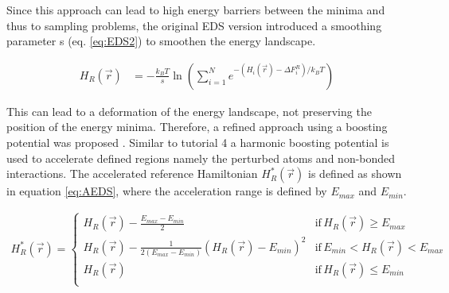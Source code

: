 Since this approach can lead to high energy barriers between the minima and thus to sampling problems, the original EDS version introduced a smoothing parameter s (eq. \ref{eq:EDS2}) to smoothen the energy landscape. 

\begin{equation}
\begin{aligned}
H_R(\vec{r}) & = -\frac{k_BT}{s} \ln  \left( \sum_{i=1}^{N} e^{ -(H_i(\vec{r}) - \Delta F_{i}^R)/k_BT} \right) 
\end{aligned}
\label{eq:EDS2}
\end{equation}

This can lead to a deformation of the energy landscape, not preserving the position of the energy minima. Therefore, a refined approach using a boosting potential was proposed \cite{JP2018,JP2020}. Similar to tutorial 4 a harmonic boosting potential is used to accelerate defined regions namely the perturbed atoms and non-bonded interactions. The accelerated reference Hamiltonian $H_R^{\ast}(\vec{r})$ is defined as shown in equation \ref{eq:AEDS}, where the acceleration range is defined by $E_{max}$ and $E_{min}$. 

\begin{equation}
  \begin{aligned}
H_R^{\ast}(\vec{r}) =\begin{cases}
        H_R(\vec{r}) - \frac{E_{max} - E_{min}}{2} &\text{if} \, H_R(\vec{r}) \geq E_{max} \\

        H_R(\vec{r}) - \frac{1}{2(E_{max} - E_{min})}(H_R(\vec{r}) -  E_{min})^2 &\text{if} \,  E_{min} < H_R(\vec{r}) < E_{max} \\

        H_R(\vec{r}) &\text{if} \, H_R(\vec{r}) \leq E_{min} \\
     \end{cases}
  \end{aligned}
  \label{eq:AEDS}
\end{equation}


